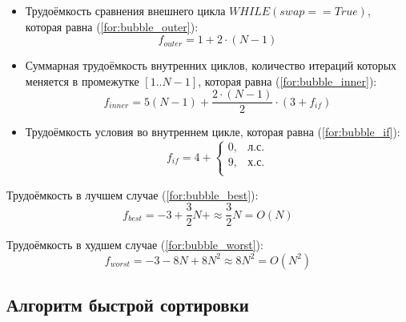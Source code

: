 \begin{itemize}
	\item Трудоёмкость сравнения внешнего цикла $WHILE(swap == True)$, которая равна (\ref{for:bubble_outer}):
	\begin{equation}
		\label{for:bubble_outer}
		f_{outer} = 1 + 2 \cdot (N - 1)
	\end{equation}
	\item Суммарная трудоёмкость внутренних циклов, количество итераций которых меняется в промежутке $[1..N-1]$, которая равна (\ref{for:bubble_inner}):
	\begin{equation}
		\label{for:bubble_inner}
		f_{inner} = 5(N - 1) + \frac{2 \cdot (N - 1)}{2} \cdot (3 + f_{if})
	\end{equation}
	\item Трудоёмкость условия во внутреннем цикле, которая равна (\ref{for:bubble_if}):
	\begin{equation}
		\label{for:bubble_if}
		f_{if} = 4 + \begin{cases}
			0, & \text{л.с.}\\
			9, & \text{х.с.}\\
		\end{cases}
	\end{equation}
\end{itemize}

Трудоёмкость в лучшем случае (\ref{for:bubble_best}):
\begin{equation}
	\label{for:bubble_best}
	f_{best} = -3 + \frac{3}{2} N + \approx \frac{3}{2} N = O(N)
\end{equation}

Трудоёмкость в худшем случае (\ref{for:bubble_worst}):
\begin{equation}
	\label{for:bubble_worst}
	f_{worst} = -3 - 8N + 8N^2 \approx 8N^2 = O(N^2)
\end{equation}



\subsection{Алгоритм быстрой сортировки}



